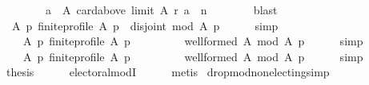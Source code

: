 \begin{isabellebody}
\ \ \ \ \ \ \ \ {\isacharbraceleft}{\kern0pt}a\ {\isasymin}\ A{\isachardot}{\kern0pt}\ card{\isacharparenleft}{\kern0pt}above\ {\isacharparenleft}{\kern0pt}limit\ A\ r{\isacharparenright}{\kern0pt}\ a{\isacharparenright}{\kern0pt}\ {\isachargreater}{\kern0pt}\ n{\isacharbraceright}{\kern0pt}\ {\isacharequal}{\kern0pt}\ {\isacharbraceleft}{\kern0pt}{\isacharbraceright}{\kern0pt}{\isachardoublequoteclose}\isanewline
\ \ \ \ \isamarkupfalse%
\ blast\isanewline
\ \ \isamarkupfalse%
\ {}{\isacharcolon}{\kern0pt}\ {\isachardoublequoteopen}{\isasymforall}A\ p{\isachardot}{\kern0pt}\ finite{\isacharunderscore}{\kern0pt}profile\ A\ p\ {\isasymlongrightarrow}\ disjoint{}\ {\isacharparenleft}{\kern0pt}{\isacharquery}{\kern0pt}mod\ A\ p{\isacharparenright}{\kern0pt}{\isachardoublequoteclose}\isanewline
\ \ \ \ \isamarkupfalse%
\ simp\isanewline
\ \ \isamarkupfalse%
\ {}\ {}\ \isamarkupfalse%
\isanewline
\ \ \ \ {\isachardoublequoteopen}{\isasymforall}A\ p{\isachardot}{\kern0pt}\ finite{\isacharunderscore}{\kern0pt}profile\ A\ p\ {\isasymlongrightarrow}\isanewline
\ \ \ \ \ \ \ \ well{\isacharunderscore}{\kern0pt}formed\ A\ {\isacharparenleft}{\kern0pt}{\isacharquery}{\kern0pt}mod\ A\ p{\isacharparenright}{\kern0pt}{\isachardoublequoteclose}\isanewline
\ \ \ \ \isamarkupfalse%
\ simp\isanewline
\ \ \isamarkupfalse%
\isanewline
\ \ \ \ {\isachardoublequoteopen}{\isasymforall}A\ p{\isachardot}{\kern0pt}\ finite{\isacharunderscore}{\kern0pt}profile\ A\ p\ {\isasymlongrightarrow}\isanewline
\ \ \ \ \ \ \ \ well{\isacharunderscore}{\kern0pt}formed\ A\ {\isacharparenleft}{\kern0pt}{\isacharquery}{\kern0pt}mod\ A\ p{\isacharparenright}{\kern0pt}{\isachardoublequoteclose}\isanewline
\ \ \ \ \isamarkupfalse%
\ simp\isanewline
\ \ \isamarkupfalse%
\ {\isacharquery}{\kern0pt}thesis\isanewline
\ \ \ \ \isamarkupfalse%
\ electoral{\isacharunderscore}{\kern0pt}modI\isanewline
\ \ \ \ \isamarkupfalse%
\ metis\isanewline
{}\isamarkupfalse%
%
\endisatagproof
{\isafoldproof}%
%
\isadelimproof
%
\endisadelimproof
%
\isadelimdocument
%
\endisadelimdocument
%
\isatagdocument
%
\isamarkuptrue%
%
\endisatagdocument
{\isafolddocument}%
%
\isadelimdocument
%
\endisadelimdocument
{}\isamarkupfalse%
\ drop{\isacharunderscore}{\kern0pt}mod{\isacharunderscore}{\kern0pt}non{\isacharunderscore}{\kern0pt}electing{\isacharbrackleft}{\kern0pt}simp{\isacharbrackright}{\kern0pt}{\isacharcolon}{\kern0pt}\isanewline

\end{isabellebody}
